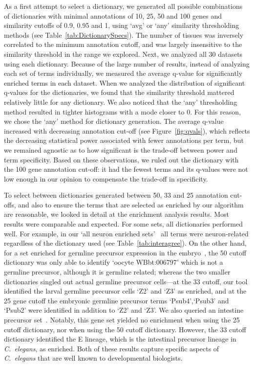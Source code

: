 \documentclass{bmcart}
\begin{document}
As a first attempt to select a dictionary, we generated all possible combinations of dictionaries with minimal annotations of 10, 25, 50 and 100 genes and similarity cutoffs of 0.9, 0.95 and 1, using `avg' or `any' similarity thresholding methods (see Table~\ref{tab:DictionarySpecs}). The number of tissues was inversely correlated to the minimum annotation cutoff, and was largely insensitive to the similarity threshold in the range we explored. Next, we analyzed all 30 datasets using each dictionary. Because of the large number of results, instead of analyzing each set of terms individually, we measured the average q-value for significantly enriched terms in each dataset. When we analyzed the distribution of significant q-values for the dictionaries, we found that the similarity threshold mattered relatively little for any dictionary. We also noticed that the `any' thresholding method resulted in tighter histograms with a mode closer to 0. For this reason, we chose the `any' method for dictionary generation. The average q-value increased with decreasing annotation cut-off (see Figure~\ref{fig:qvals}), which reflects the decreasing statistical power associated with fewer annotations per term, but we remained agnostic as to how significant is the trade-off between power and term specificity. Based on these observations, we ruled out the dictionary with the 100 gene annotation cut-off: it had the fewest terms and its q-values were not low enough in our opinion to compensate the trade-off in specificity. 

To select between dictionaries generated between 50, 33 and 25 annotation cut-offs, and also to ensure the terms that are selected as enriched by our algorithm are reasonable, we looked in detail at the enrichment analysis results.
Most results were comparable and expected. For some sets, all dictionaries performed well. For example, in our `all neuron enriched sets'~\cite{Spencer2011, Watson2008a} all terms were neuron-related %
regardless of the dictionary used (see Table~\ref{tab:interagree}). On the other hand, for a set enriched for germline precursor expression in the embryo~\cite{Spencer2011}, the 50 cutoff dictionary was only able to identify `oocyte WBbt:006797' which is not a germline precursor, although it is germline related; whereas the two smaller dictionaries singled out actual germline precursor cells---at the 33 cutoff, our tool identified the larval germline precursor cells `Z2' and `Z3' as enriched, and at the 25 gene cutoff the embryonic germline precursor terms `Psub4',`Psub3' and `Psub2' were identified in addition to `Z2' and `Z3'. 
We also queried an intestine precursor set~\cite{Spencer2011}. Notably, this gene set yielded no enrichment when using the 25 cutoff dictionary, nor when using the 50 cutoff dictionary. However, the 33 cutoff dictionary identified the E lineage, which is the intestinal precursor lineage in \emph{C.~elegans}, as enriched. Both of these results capture specific aspects of \emph{C.~elegans} that are well known to developmental biologists. 
\end{document}
